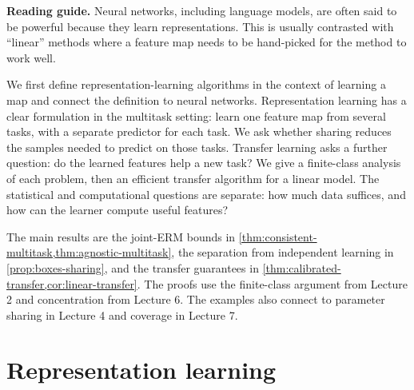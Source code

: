 \documentclass[11pt,twoside]{article}
\theoremstyle{definition}
\theoremstyle{remark}
\begin{document}
\begin{center}
\end{center}

\noindent\textbf{Reading guide.}
Neural networks, including language models, are often said to be powerful
because they learn representations. This is usually contrasted with
``linear'' methods where a feature map needs to be hand-picked
for the method to work well.

We first define representation-learning algorithms in the context of learning
a map and connect the definition to neural networks. Representation learning
has a clear formulation in the multitask setting: learn one feature map from
several tasks, with a separate predictor for each task. We ask whether sharing
reduces the samples needed to predict on those tasks. Transfer learning asks a
further question: do the learned features help a new task? We give a
finite-class analysis of each problem, then an efficient transfer algorithm
for a linear model. The statistical and computational questions are separate:
how much data suffices, and how can the learner compute useful features?

The main results are the joint-ERM bounds in
\cref{thm:consistent-multitask,thm:agnostic-multitask}, the separation from
independent learning in \cref{prop:boxes-sharing}, and the transfer guarantees
in \cref{thm:calibrated-transfer,cor:linear-transfer}. The proofs use the
finite-class argument from Lecture 2 and concentration from Lecture 6.
The examples also connect to parameter sharing in Lecture 4 and coverage in
Lecture 7.

\section{Representation learning}
\label{sec:representation-learning}
\end{document}
